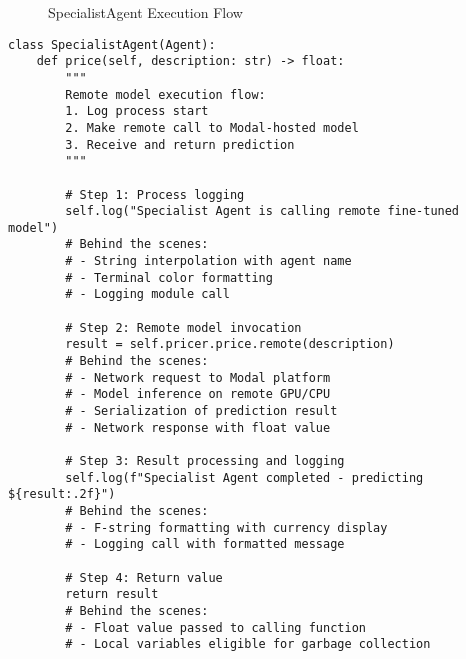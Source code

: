 \begin{figure}[htbp]
\centering
{}
\caption{SpecialistAgent Execution Flow}
\label{fig:specialist_flow}
\end{figure}

\begin{lstlisting}[caption=SpecialistAgent Detailed Execution]
class SpecialistAgent(Agent):
    def price(self, description: str) -> float:
        """
        Remote model execution flow:
        1. Log process start
        2. Make remote call to Modal-hosted model
        3. Receive and return prediction
        """
        
        # Step 1: Process logging
        self.log("Specialist Agent is calling remote fine-tuned model")
        # Behind the scenes: 
        # - String interpolation with agent name
        # - Terminal color formatting
        # - Logging module call
        
        # Step 2: Remote model invocation
        result = self.pricer.price.remote(description)
        # Behind the scenes:
        # - Network request to Modal platform
        # - Model inference on remote GPU/CPU
        # - Serialization of prediction result
        # - Network response with float value
        
        # Step 3: Result processing and logging
        self.log(f"Specialist Agent completed - predicting ${result:.2f}")
        # Behind the scenes:
        # - F-string formatting with currency display
        # - Logging call with formatted message
        
        # Step 4: Return value
        return result
        # Behind the scenes:
        # - Float value passed to calling function
        # - Local variables eligible for garbage collection
\end{lstlisting}

